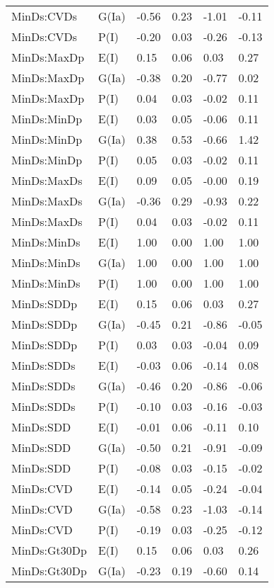 \begin{center}
\begin{longtable}{|p{1.1in}|p{0.7in}|p{0.7in}|p{0.6in}|p{0.6in}|p{0.6in}|}
  MinDs:CVDs & G(Ia) & -0.56 & 0.23 & -1.01 & -0.11 \\ 
  MinDs:CVDs & P(I) & -0.20 & 0.03 & -0.26 & -0.13 \\ 
  MinDs:MaxDp & E(I) & 0.15 & 0.06 & 0.03 & 0.27 \\ 
  MinDs:MaxDp & G(Ia) & -0.38 & 0.20 & -0.77 & 0.02 \\ 
  MinDs:MaxDp & P(I) & 0.04 & 0.03 & -0.02 & 0.11 \\ 
  MinDs:MinDp & E(I) & 0.03 & 0.05 & -0.06 & 0.11 \\ 
  MinDs:MinDp & G(Ia) & 0.38 & 0.53 & -0.66 & 1.42 \\ 
  MinDs:MinDp & P(I) & 0.05 & 0.03 & -0.02 & 0.11 \\ 
  MinDs:MaxDs & E(I) & 0.09 & 0.05 & -0.00 & 0.19 \\ 
  MinDs:MaxDs & G(Ia) & -0.36 & 0.29 & -0.93 & 0.22 \\ 
  MinDs:MaxDs & P(I) & 0.04 & 0.03 & -0.02 & 0.11 \\ 
  MinDs:MinDs & E(I) & 1.00 & 0.00 & 1.00 & 1.00 \\ 
  MinDs:MinDs & G(Ia) & 1.00 & 0.00 & 1.00 & 1.00 \\ 
  MinDs:MinDs & P(I) & 1.00 & 0.00 & 1.00 & 1.00 \\ 
  MinDs:SDDp & E(I) & 0.15 & 0.06 & 0.03 & 0.27 \\ 
  MinDs:SDDp & G(Ia) & -0.45 & 0.21 & -0.86 & -0.05 \\ 
  MinDs:SDDp & P(I) & 0.03 & 0.03 & -0.04 & 0.09 \\ 
  MinDs:SDDs & E(I) & -0.03 & 0.06 & -0.14 & 0.08 \\ 
  MinDs:SDDs & G(Ia) & -0.46 & 0.20 & -0.86 & -0.06 \\ 
  MinDs:SDDs & P(I) & -0.10 & 0.03 & -0.16 & -0.03 \\ 
  MinDs:SDD & E(I) & -0.01 & 0.06 & -0.11 & 0.10 \\ 
  MinDs:SDD & G(Ia) & -0.50 & 0.21 & -0.91 & -0.09 \\ 
  MinDs:SDD & P(I) & -0.08 & 0.03 & -0.15 & -0.02 \\ 
  MinDs:CVD & E(I) & -0.14 & 0.05 & -0.24 & -0.04 \\ 
  MinDs:CVD & G(Ia) & -0.58 & 0.23 & -1.03 & -0.14 \\ 
  MinDs:CVD & P(I) & -0.19 & 0.03 & -0.25 & -0.12 \\ 
  MinDs:Gt30Dp & E(I) & 0.15 & 0.06 & 0.03 & 0.26 \\ 
  MinDs:Gt30Dp & G(Ia) & -0.23 & 0.19 & -0.60 & 0.14 \\ 

\end{longtable}
\end{center}
